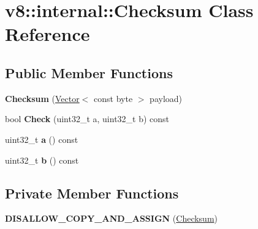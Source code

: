 \hypertarget{classv8_1_1internal_1_1_checksum}{}\section{v8\+:\+:internal\+:\+:Checksum Class Reference}
\label{classv8_1_1internal_1_1_checksum}
\subsection*{Public Member Functions}
\begin{DoxyCompactItemize}
\item 
{\bfseries Checksum} (\hyperlink{classv8_1_1internal_1_1_vector}{Vector}$<$ const byte $>$ payload)\hypertarget{classv8_1_1internal_1_1_checksum_a989a219adbdba78fece07f09cfc4f5cd}{}\label{classv8_1_1internal_1_1_checksum_a989a219adbdba78fece07f09cfc4f5cd}

\item 
bool {\bfseries Check} (uint32\+\_\+t a, uint32\+\_\+t b) const \hypertarget{classv8_1_1internal_1_1_checksum_ad12ae0842d5a57dc9d86cf2a01139d80}{}\label{classv8_1_1internal_1_1_checksum_ad12ae0842d5a57dc9d86cf2a01139d80}

\item 
uint32\+\_\+t {\bfseries a} () const \hypertarget{classv8_1_1internal_1_1_checksum_a83dbedda3b834dc2717a4a0d512b61d0}{}\label{classv8_1_1internal_1_1_checksum_a83dbedda3b834dc2717a4a0d512b61d0}

\item 
uint32\+\_\+t {\bfseries b} () const \hypertarget{classv8_1_1internal_1_1_checksum_aa957d2ae8e43fefd226db9eb5cc9a771}{}\label{classv8_1_1internal_1_1_checksum_aa957d2ae8e43fefd226db9eb5cc9a771}

\end{DoxyCompactItemize}
\subsection*{Private Member Functions}
\begin{DoxyCompactItemize}
\item 
{\bfseries D\+I\+S\+A\+L\+L\+O\+W\+\_\+\+C\+O\+P\+Y\+\_\+\+A\+N\+D\+\_\+\+A\+S\+S\+I\+GN} (\hyperlink{classv8_1_1internal_1_1_checksum}{Checksum})\hypertarget{classv8_1_1internal_1_1_checksum_a457e8d0a2bfacc548f779f3cc870b26c}{}\label{classv8_1_1internal_1_1_checksum_a457e8d0a2bfacc548f779f3cc870b26c}

\end{DoxyCompactItemize}
